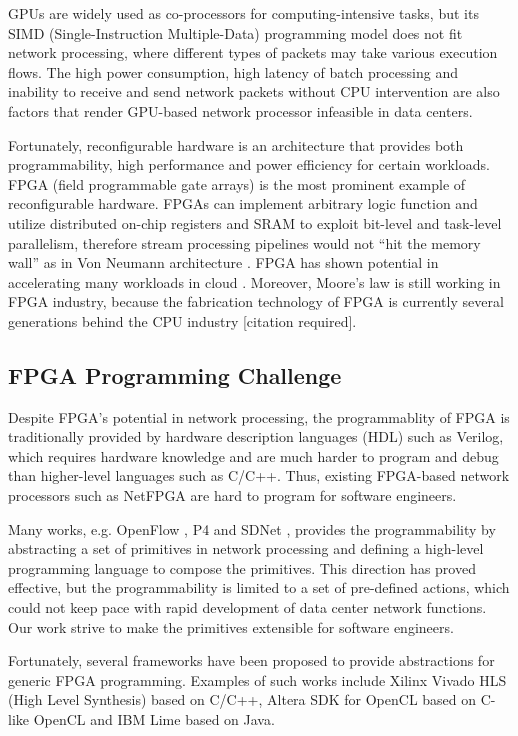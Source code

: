 {GPUs are widely used as co-processors for computing-intensive tasks, but its SIMD (Single-Instruction Multiple-Data) programming model does not fit network processing, where different types of packets may take various execution flows. The high power consumption, high latency of batch processing and inability to receive and send network packets without CPU intervention are also factors that render GPU-based network processor infeasible in data centers.

Fortunately, reconfigurable hardware is an architecture that provides both programmability, high performance and power efficiency for certain workloads. FPGA (field programmable gate arrays) is the most prominent example of reconfigurable hardware. FPGAs can implement arbitrary logic function and utilize distributed on-chip registers and SRAM to exploit bit-level and task-level parallelism, therefore stream processing pipelines would not ``hit the memory wall'' as in Von Neumann architecture \cite{bacon2013fpga}. FPGA has shown potential in accelerating many workloads in cloud \cite{putnam2014reconfigurable}. Moreover, Moore's law is still working in FPGA industry, because the fabrication technology of FPGA is currently several generations behind the CPU industry [citation required].

\subsection{FPGA Programming Challenge}

Despite FPGA's potential in network processing, the programmablity of FPGA is traditionally provided by hardware description languages (HDL) such as Verilog, which requires hardware knowledge and are much harder to program and debug than higher-level languages such as C/C++. Thus, existing FPGA-based network processors such as NetFPGA \cite{lockwood2007netfpga} are hard to program for software engineers.

Many works, e.g. OpenFlow \cite{mckeown2008openflow}, P4 \cite{bosshart2014p4} and SDNet \cite{xilinxsdnet}, provides the programmability by abstracting a set of primitives in network processing and defining a high-level programming language to compose the primitives. This direction has proved effective, but the programmability is limited to a set of pre-defined actions, which could not keep pace with rapid development of data center network functions. Our work strive to make the primitives extensible for software engineers.

Fortunately, several frameworks have been proposed to provide abstractions for generic FPGA programming. Examples of such works include Xilinx Vivado HLS (High Level Synthesis) \cite{feist2012vivado} based on C/C++, Altera SDK for OpenCL \cite{czajkowski2012opencl} based on C-like OpenCL and IBM Lime \cite{auerbach2010lime} based on Java.

}
